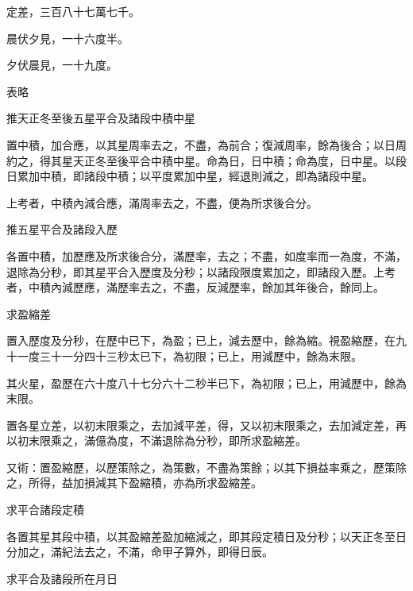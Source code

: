 \begin{pinyinscope}
 定差，三百八十七萬七千。



 晨伏夕見，一十六度半。



 夕伏晨見，一十九度。



 表略



 推天正冬至後五星平合及諸段中積中星



 置中積，加合應，以其星周率去之，不盡，為前合；復減周率，餘為後合；以日周約之，得其星天正冬至後平合中積中星。命為日，日中積；命為度，日中星。以段日累加中積，即諸段中積；以平度累加中星，經退則減之，即為諸段中星。



 上考者，中積內減合應，滿周率去之，不盡，便為所求後合分。



 推五星平合及諸段入歷



 各置中積，加歷應及所求後合分，滿歷率，去之；不盡，如度率而一為度，不滿，退除為分秒，即其星平合入歷度及分秒；以諸段限度累加之，即諸段入歷。上考者，中積內減歷應，滿歷率去之，不盡，反減歷率，餘加其年後合，餘同上。



 求盈縮差



 置入歷度及分秒，在歷中已下，為盈；已上，減去歷中，餘為縮。視盈縮歷，在九十一度三十一分四十三秒太已下，為初限；已上，用減歷中，餘為末限。



 其火星，盈歷在六十度八十七分六十二秒半已下，為初限；已上，用減歷中，餘為末限。



 置各星立差，以初末限乘之，去加減平差，得，又以初末限乘之，去加減定差，再以初末限乘之，滿億為度，不滿退除為分秒，即所求盈縮差。



 又術：置盈縮歷，以歷策除之，為策數，不盡為策餘；以其下損益率乘之，歷策除之，所得，益加損減其下盈縮積，亦為所求盈縮差。



 求平合諸段定積



 各置其星其段中積，以其盈縮差盈加縮減之，即其段定積日及分秒；以天正冬至日分加之，滿紀法去之，不滿，命甲子算外，即得日辰。



 求平合及諸段所在月日




\end{pinyinscope}
